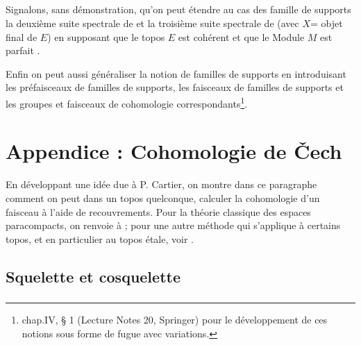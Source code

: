\setcounter{subsection}{15}
\subsection{}
Signalons, sans démonstration, qu'on peut étendre au cas des
famille de supports la deuxième suite spectrale de  et la
troisième suite spectrale de  (avec $X $= objet final de $E$)
en supposant que le topos $E$ est cohérent et que le Module $M$ est
parfait \cite{13}.

Enfin on peut aussi généraliser la notion de familles de supports
en introduisant les préfaisceaux de familles de supports, les
faisceaux de familles de supports et les groupes \pageoriginale et
faisceaux de cohomologie correspondants\footnote{\cf \cite{12} chap.IV, \S
  1 (Lecture Notes 20, Springer) pour le développement de ces
  notions sous forme de fugue avec variations.}.

\section{Appendice : Cohomologie de Čech}

En développant une idée due à P. Cartier, on montre dans ce
paragraphe comment on peut dans un topos quelconque, calculer la
cohomologie d'un faisceau à l'aide de recouvrements. Pour la théorie
classique des espaces paracompacts, on renvoie à \cite{7}; pour une
autre méthode qui s'applique à certains topos, et en particulier au
topos étale, voir \cite{14}.

\subsection{Squelette et cosquelette}

\setcounter{subsubsection}{-1}
\subsubsection{}

